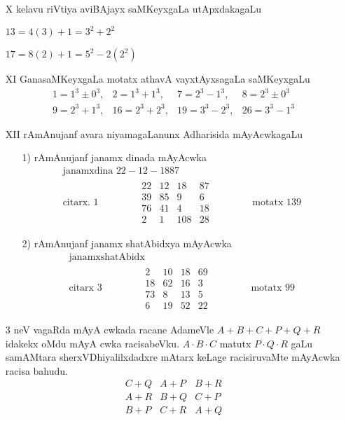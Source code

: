 \begin{enumerate}
\item[{\rm X}] kelavu riVtiya aviBAjayx saMKeyxgaLa utApxdakagaLu

$13=4(3)+1 = 3^{2}+2^{2}$

$17=8(2)+1 = 5^{2}-2(2^{2})$

\item[{\rm XI}] GanasaMKeyxgaLa motatx athavA vayxtAyxsagaLa saMKeyxgaLu
$$
\begin{matrix}
1=1^3\pm 0^3, & 2=1^3+1^3, & 7= 2^3-1^3, & 8= 2^3\pm 0^3\\
9=2^3+1^3, & 16=2^3+2^3, & 19=3^3-2^3, & 26=3^3-1^3 
\end{matrix}
$$
\item[{\rm XII}] rAmAnujanf avara niyamagaLanunx Adharisida mAyAcwkagaLu
\begin{itemize}
\item[{\rm 1)}] rAmAnujanf janamx dinada mAyAcwka
\begin{gather*}
\text{janamxdina } 22-12-1887\\
\text{citarx. }  1 \qquad \qquad 
\begin{matrix}
22 & 12 & 18 & 87\\
39 & 85 & 9 & 6\\
76 & 41 & 4 & 18\\
2 & 1 & 108 & 28
\end{matrix} \qquad \qquad
\text{motatx } 139
\end{gather*}

\item[{\rm 2)}] rAmAnujanf janamx shatAbidxya mAyAcwka
\begin{gather*}
\text{janamxshatAbidx }\\
\text{citarx } 3 \qquad \qquad 
\begin{matrix}
2 & 10 & 18 & 69\\
18 & 62 & 16 & 3\\
73 & 8 & 13 & 5\\
6 & 19 & 52 & 22
\end{matrix} \qquad \qquad 
\text{motatx } 99
\end{gather*}
\end{itemize}

{\rm 3} neV vagaRda mAyA cwkada racane AdameVle $A+B+C+P+Q+R$ idakekx oMdu mAyA cwka racisabeVku. $A\cdot B\cdot C$ matutx $P\cdot Q\cdot R$ gaLu samAMtara sherxVDhiyalilxdadxre mAtarx keLage racisiruvaMte mAyAcwka racisa bahudu.
$$
\begin{matrix}
C+Q & A+P & B+R\\
A+R & B+Q & C+P\\
B+P & C+R & A+Q
\end{matrix}
$$
 

\end{enumerate}
